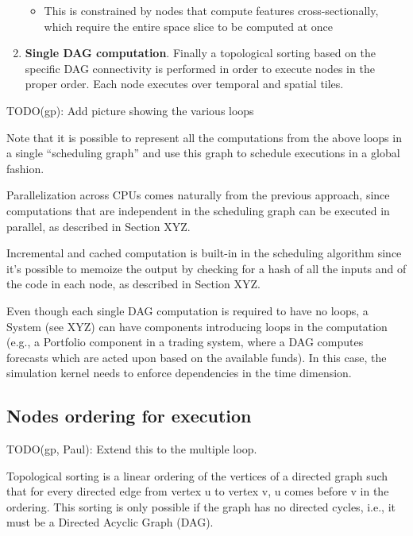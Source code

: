 \documentclass[11pt, reqno]{amsart}
\theoremstyle{definition}
\theoremstyle{remark}
\begin{document}
\begin{enumerate}
        \begin{itemize}
          \item This is constrained by nodes that compute features
                cross-sectionally, which require the entire space slice to be
                computed at once
        \end{itemize}
  \item \textbf{Single DAG computation}. Finally a topological sorting
        based on the specific DAG connectivity is performed in order to execute
        nodes in the proper order. Each node executes over temporal and spatial tiles.
\end{enumerate}

TODO(gp): Add picture showing the various loops

Note that it is possible to represent all the computations from the above loops
in a single ``scheduling graph'' and use this graph to schedule executions in a
global fashion.

Parallelization across CPUs comes naturally from the previous approach,
since computations that are independent in the scheduling graph can be
executed in parallel, as described in Section XYZ.

Incremental and cached computation is built-in in the scheduling
algorithm since it's possible to memoize the output by checking for a
hash of all the inputs and of the code in each node, as described in Section XYZ.

Even though each single DAG computation is required to have no loops, a System
(see XYZ) can have components introducing loops in the computation
(e.g., a Portfolio component in a trading system, where a DAG computes
forecasts which are acted upon based on the available funds). In this
case, the simulation kernel needs to enforce dependencies in the time
dimension.

\subsection{Nodes ordering for execution}

TODO(gp, Paul): Extend this to the multiple loop.

Topological sorting is a linear ordering of the vertices of a directed
graph such that for every directed edge from vertex u to vertex v, u
comes before v in the ordering. This sorting is only possible if the
graph has no directed cycles, i.e., it must be a Directed Acyclic Graph
(DAG).
\end{document}
